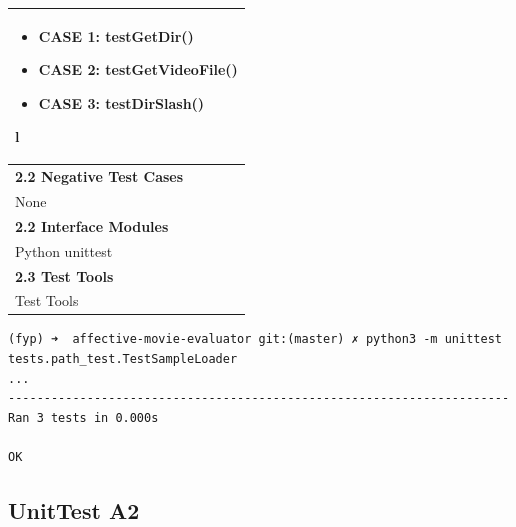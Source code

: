 \documentclass[12pt,a4paper,man]{report}
\begin{document}
\begin{longtable}{|p{6in}|}
\begin{itemize}
 \item CASE 1: testGetDir()           
 \item CASE 2: testGetVideoFile() 
 \item CASE 3: testDirSlash()     
\end{itemize}l
\\\hline
\textbf{2.2 Negative Test Cases}\\\hline
None\\\hline
\textbf{2.2 Interface Modules}\\\hline
Python unittest\\\hline
\textbf{2.3 Test Tools}\\\hline
Test Tools\\ 
\hline
\end{longtable}


\begin{verbatim}
(fyp) ➜  affective-movie-evaluator git:(master) ✗ python3 -m unittest tests.path_test.TestSampleLoader
...
----------------------------------------------------------------------
Ran 3 tests in 0.000s

OK
\end{verbatim}



\subsection{UnitTest A2}
\label{sec:org17ff4a0}
\end{document}
